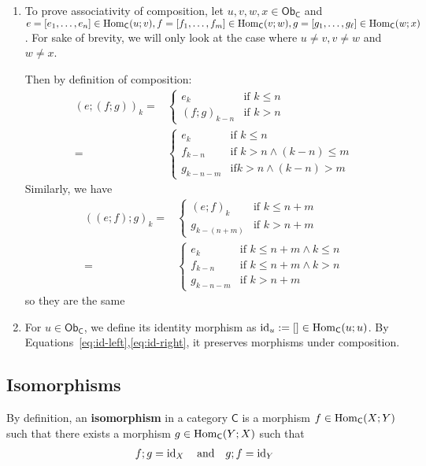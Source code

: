 \begin{enumerate}
  \item To prove associativity of composition, let $u,v,w,x \in \textsf{Ob}_{\textsf{C}}$ and $e = [e_1,\ldots,e_n] \in \operatorname{Hom}_{\textsf{C}}(u;v),f = [f_1,\ldots,f_m]\in \operatorname{Hom}_{\textsf{C}}(v;w),g = [g_1,\ldots,g_\ell] \in \operatorname{Hom}_{\textsf{C}}(w;x)$.
    For sake of brevity, we will only look at the case where $u \neq v, v \neq w$ and $w \neq x$.

    Then by definition of composition:
    \begin{align*}
      {(e;(f;g))}_k
      =
      &\left\{\begin{array}{ll}
          e_k & \text{if } k \leq n \\
        {(f;g)}_{k-n} & \text{if } k > n
      \end{array} \right.
      \\
      =
      &\left\{\begin{array}{ll}
          e_k & \text{if } k \leq n \\
          f_{k-n} & \text{if } k > n \land (k-n) \leq m \\
          g_{k-n - m} & \text{if} k > n \land (k-n) > m
      \end{array} \right.
    \end{align*}
    Similarly, we have
    \begin{align*}
      {((e;f);g)}_k
      =
      &\left\{\begin{array}{ll}
        {(e;f)}_k & \text{if } k \leq n+m\\
        g_{k-(n+m)} & \text{if }k > n+m
      \end{array} \right.
      \\
      =
      &\left\{\begin{array}{ll}
        e_k & \text{if }k \leq n + m \land k \leq n\\
        f_{k-n} & \text{if }k \leq n+m \land k > n\\
        g_{k-n-m} & \text{if } k> n+m
      \end{array} \right.
    \end{align*}
    so they are the same
  \item For $u \in \textsf{Ob}_{\textsf{C}}$, we define its identity morphism as $\operatorname{id}_u := [] \in \operatorname{Hom}_{\textsf{C}}(u;u)$.
    By Equations~\eqref{eq:id-left},\eqref{eq:id-right}, it preserves morphisms under composition.
\end{enumerate}

\subsection{Isomorphisms}
By definition, an \textbf{isomorphism} in a category $\textsf{C}$ is a morphism $f \in \operatorname{Hom}_{\textsf{C}}(X;Y)$ such that there exists a morphism $g \in \operatorname{Hom}_{\textsf{C}}(Y;X)$ such that
\begin{align*}
  f;g = \operatorname{id}_X
  \quad \text{and} \quad 
  g;f = \operatorname{id}_Y
\end{align*}

